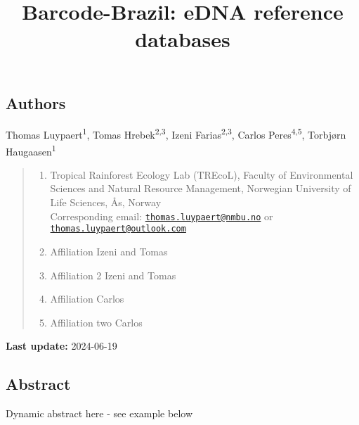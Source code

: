 \documentclass[
  letterpaper,
  DIV=11,
  numbers=noendperiod]{scrartcl}
\title{Barcode-Brazil: eDNA reference databases}
\author{}
\date{}
\begin{document}
\maketitle

\subsection{Authors}\label{authors}

Thomas Luypaert\textsuperscript{1}, Tomas Hrebek\textsuperscript{2,3},
Izeni Farias\textsuperscript{2,3}, Carlos Peres\textsuperscript{4,5},
Torbjørn Haugaasen\textsuperscript{1}

\begin{quote}
\begin{enumerate}
\def\labelenumi{(\arabic{enumi})}
\item
  Tropical Rainforest Ecology Lab (TREcoL), Faculty of Environmental
  Sciences and Natural Resource Management, Norwegian University of Life
  Sciences, Ås, Norway\\
  Corresponding email:
  \href{mailto:thomas.luypaert@nmbu.no}{\nolinkurl{thomas.luypaert@nmbu.no}}
  or
  \href{mailto:thomas.luypaert@outlook.com}{\nolinkurl{thomas.luypaert@outlook.com}}
\item
  Affiliation Izeni and Tomas
\item
  Affiliation 2 Izeni and Tomas
\item
  Affiliation Carlos
\item
  Affiliation two Carlos
\end{enumerate}
\end{quote}

\textbf{Last update:} 2024-06-19

\subsection{Abstract}\label{abstract}

Dynamic abstract here - see example below
\end{document}
